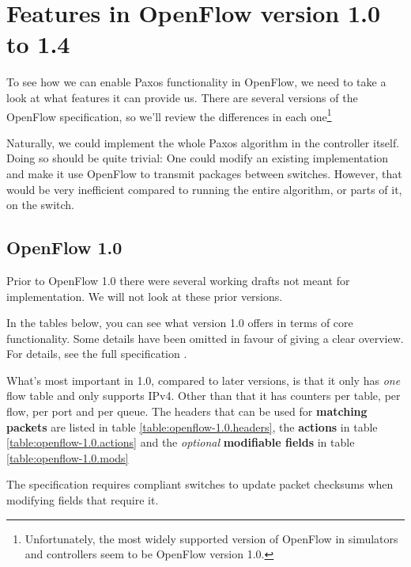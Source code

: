 \section{Features in OpenFlow version 1.0 to 1.4}


To see how we can enable Paxos functionality in OpenFlow, we need to take a
look at what features it can provide us.  There are several versions of the
OpenFlow specification, so we'll review the differences in each
one\footnote{Unfortunately, the most widely supported version of OpenFlow in
simulators and controllers seem to be OpenFlow version 1.0.}

Naturally, we could implement the whole Paxos algorithm in the controller
itself.  Doing so should be quite trivial: One could modify an existing
implementation and make it use OpenFlow to transmit packages between
switches.  However, that would be very inefficient compared to running the
entire algorithm, or parts of it, on the switch.

\subsection{OpenFlow 1.0}

Prior to OpenFlow 1.0 \cite{openflow-1.0} there were several working
drafts not meant for implementation.  We will not look at these prior
versions.

In the tables below, you can see what version 1.0 offers in terms of core
functionality.  Some details have been omitted in favour of giving a clear
overview.  For details, see the full specification \cite{openflow-1.0}.

What's most important in 1.0, compared to later versions, is that it only
has {\em one} flow table and only supports IPv4.  Other than that it has
counters per table, per flow, per port and per queue.  The headers that can
be used for \textbf{matching packets} are listed in table
\ref{table:openflow-1.0.headers}, the \textbf{actions} in table
\ref{table:openflow-1.0.actions} and the {\em optional} \textbf{modifiable
  fields} in table \ref{table:openflow-1.0.mods}

The specification requires compliant switches to update packet checksums
when modifying fields that require it.


